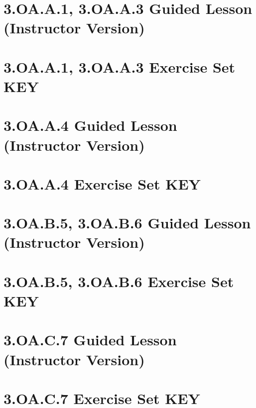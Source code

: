 \documentclass[a4paper,12pt]{article}
\title{}
\date{}
\begin{document}

\hypertarget{toc}{}
\tableofcontents
\newpage

\pagestyle{fancy}

\newpage
\section{3.OA.A.1, 3.OA.A.3 Guided Lesson (Instructor Version)}


\newpage
\section{3.OA.A.1, 3.OA.A.3 Exercise Set KEY }


\newpage
\section{3.OA.A.4 Guided Lesson (Instructor Version)}


\newpage
\section{3.OA.A.4 Exercise Set KEY }


\newpage
\section{3.OA.B.5, 3.OA.B.6 Guided Lesson (Instructor Version)}


\newpage
\section{3.OA.B.5, 3.OA.B.6 Exercise Set KEY }


\newpage
\section{3.OA.C.7 Guided Lesson (Instructor Version)}


\newpage
\section{3.OA.C.7 Exercise Set KEY }

\end{document}
